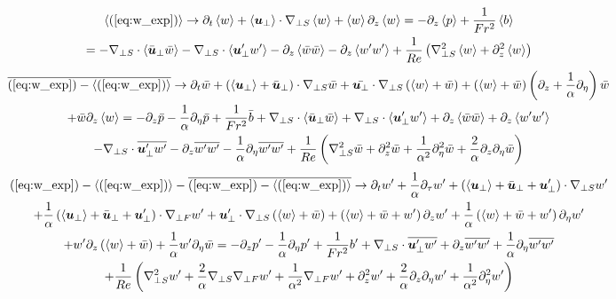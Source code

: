 \documentclass{article}
\begin{document}
\begin{multline}
    \left<(\ref{eq:w_exp})\right> \to \partial_t \left<w\right> +
    \left<\boldsymbol{u}_{\perp}\right>\cdot\nabla_{\perp S}\left<w\right> 
     + \left<w\right>\partial_z\left<w\right> = - \partial_z\left<p\right> +
     \frac{1}{Fr^2}\left<b\right>
     \\
    = -\nabla_{\perp S}\cdot\left<\bar{\boldsymbol{u}}_{\perp} \bar{w}\right> -
    \nabla_{\perp S}\cdot\left<\boldsymbol{u}'_{\perp} w'\right>-\partial_z\left<\bar{w}\bar{w}\right> - \partial_z\left<w'w'\right>
    + \frac{1}{Re}\left(\nabla_{\perp S}^2\left<w\right> + \partial_z^2\left<w\right>\right)
    \label{eq:w_bracket_eq}
\end{multline}
\begin{multline}
    \overline{(\ref{eq:w_exp}) - \left<(\ref{eq:w_exp})\right>} \to \partial_t \bar{w} +
    \left(\left<\boldsymbol{u}_{\perp}\right> + \bar{\boldsymbol{u}}_{\perp}\right)\cdot\nabla_{\perp S} \bar{w} +
    \bar{\boldsymbol{u}_{\perp}} \cdot\nabla_{\perp S}\left(\left<w\right> + \bar{w}\right)  + 
    \left(\left<w\right> + \bar{w}\right)\left(\partial_z +
    \frac{1}{\alpha}\partial_{\eta}\right)\bar{w}
    \\
    + \bar{w}\partial_z\left<w\right>
    = - \partial_z
    \bar{p} - \frac{1}{\alpha}\partial_{\eta}\bar{p} + \frac{1}{Fr^2}\bar{b}
    + \nabla_{\perp S}\cdot\left<\bar{\boldsymbol{u}}_{\perp}\bar{w}\right>+ 
    \nabla_{\perp S}\cdot\left<\boldsymbol{u}_{\perp}'w'\right> + \partial_z\left<\bar{w}\bar{w}\right> +
    \partial_z\left<w'w'\right> 
    \\
    - \nabla_{\perp S}\cdot\overline{\boldsymbol{u}_{\perp}'w'} -
    \partial_z\overline{w'w'} - \frac{1}{\alpha}\partial_{\eta}\overline{w'w'} +
    \frac{1}{Re}\left(\nabla_{\perp S}^2\bar{w} + \partial_z^2\bar{w} +
    \frac{1}{\alpha^2}\partial_{\eta}^2\bar{w} +
    \frac{2}{\alpha}\partial_z\partial_{\eta}\bar{w}\right)
    \label{eq:w_bar_eq}
\end{multline}
\begin{multline}
    (\ref{eq:w_exp}) - \left<(\ref{eq:w_exp})\right> - \overline{(\ref{eq:w_exp}) -
    \left<(\ref{eq:w_exp})\right>} \to \partial_t w' +
    \frac{1}{\alpha}\partial_{\tau} w' + \left(\left<\boldsymbol{u}_{\perp}\right> +
    \bar{\boldsymbol{u}}_{\perp} + \boldsymbol{u}_{\perp}'\right)\cdot\nabla_{\perp S} w' 
    \\
    +\frac{1}{\alpha}\left(\left<\boldsymbol{u}_{\perp}\right> +
    \bar{\boldsymbol{u}}_{\perp} + \boldsymbol{u}_{\perp}'\right)\cdot\nabla_{\perp F} w'
    + \boldsymbol{u}_{\perp}'\cdot\nabla_{\perp S}\left(\left<w\right> + \bar{w}\right)
    + \left(\left<w\right> + \bar{w} + w'\right)\partial_zw' + \frac{1}{\alpha}\left(\left<w\right> + \bar{w} + w'\right)\partial_{\eta}w'  
    \\
    +  w'\partial_z\left(\left<w\right> +
    \bar{w}\right) + \frac{1}{\alpha}w'\partial_{\eta}\bar{w}
     = -\partial_z p' - \frac{1}{\alpha}\partial_{\eta}p' + \frac{1}{Fr^2}b' + 
     \nabla_{\perp S}\cdot\overline{\boldsymbol{u}_{\perp}'w'} +
    \partial_z\overline{w'w'} + \frac{1}{\alpha}\partial_{\eta}\overline{w'w'}
    \\
    + \frac{1}{Re}\left(\nabla_{\perp S}^2w' + \frac{2}{\alpha}\nabla_{\perp S}\nabla_{\perp F} w' +
    \frac{1}{\alpha^2}\nabla_{\perp F} w' + \partial_z^2w' +
    \frac{2}{\alpha}\partial_z\partial_{\eta}w' +
    \frac{1}{\alpha^2}\partial_{\eta}^2w'\right) \label{eq:w_pert_eq}
\end{multline}
\end{document}
